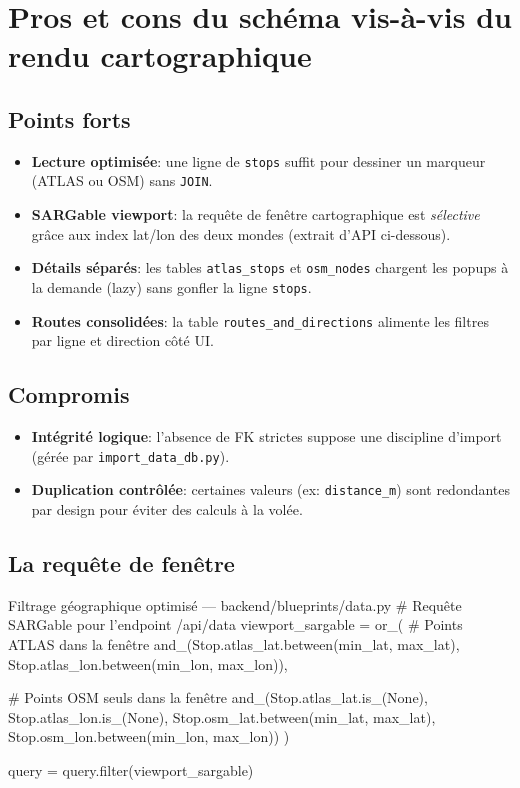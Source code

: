 \section{Pros et cons du schéma vis-à-vis du rendu cartographique}
\subsection*{Points forts}
\begin{itemize}
  \item \textbf{Lecture optimisée}: une ligne de \texttt{stops} suffit pour dessiner un marqueur (ATLAS ou OSM) sans \texttt{JOIN}.
  \item \textbf{SARGable viewport}: la requête de fenêtre cartographique est \emph{sélective} grâce aux index lat/lon des deux mondes (extrait d'API ci-dessous).
  \item \textbf{Détails séparés}: les tables \texttt{atlas\_stops} et \texttt{osm\_nodes} chargent les popups à la demande (lazy) sans gonfler la ligne \texttt{stops}.
  \item \textbf{Routes consolidées}: la table \texttt{routes\_and\_directions} alimente les filtres par ligne et direction côté UI.
\end{itemize}

\subsection*{Compromis}
\begin{itemize}
  \item \textbf{Intégrité logique}: l'absence de FK strictes suppose une discipline d'import (gérée par \texttt{import\_data\_db.py}).
  \item \textbf{Duplication contrôlée}: certaines valeurs (ex: \texttt{distance\_m}) sont redondantes par design pour éviter des calculs à la volée.
\end{itemize}

\subsection*{La requête de fenêtre}

\begin{codebox}[language=Python]{Filtrage géographique optimisé — backend/blueprints/data.py}
# Requête SARGable pour l'endpoint /api/data
viewport_sargable = or_(
    # Points ATLAS dans la fenêtre
    and_(Stop.atlas_lat.between(min_lat, max_lat),
         Stop.atlas_lon.between(min_lon, max_lon)),
    
    # Points OSM seuls dans la fenêtre  
    and_(Stop.atlas_lat.is_(None), Stop.atlas_lon.is_(None),
         Stop.osm_lat.between(min_lat, max_lat),
         Stop.osm_lon.between(min_lon, max_lon))
)

query = query.filter(viewport_sargable)
\end{codebox}


